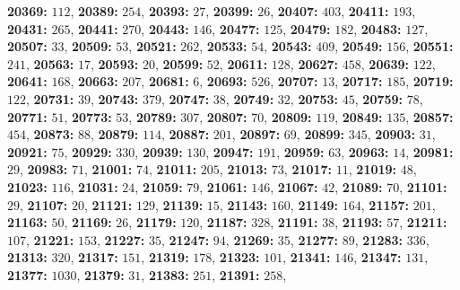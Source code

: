 \textsf{\bfseries 20369:} $112$, \textsf{\bfseries 20389:} $254$, \textsf{\bfseries 20393:} $27$, \textsf{\bfseries 20399:} $26$, \textsf{\bfseries 20407:} $403$, \textsf{\bfseries 20411:} $193$, \textsf{\bfseries 20431:} $265$, \textsf{\bfseries 20441:} $270$, \textsf{\bfseries 20443:} $146$, \textsf{\bfseries 20477:} $125$, \textsf{\bfseries 20479:} $182$, \textsf{\bfseries 20483:} $127$, \textsf{\bfseries 20507:} $33$, \textsf{\bfseries 20509:} $53$, \textsf{\bfseries 20521:} $262$, \textsf{\bfseries 20533:} $54$, \textsf{\bfseries 20543:} $409$, \textsf{\bfseries 20549:} $156$, \textsf{\bfseries 20551:} $241$, \textsf{\bfseries 20563:} $17$, \textsf{\bfseries 20593:} $20$, \textsf{\bfseries 20599:} $52$, \textsf{\bfseries 20611:} $128$, \textsf{\bfseries 20627:} $458$, \textsf{\bfseries 20639:} $122$, \textsf{\bfseries 20641:} $168$, \textsf{\bfseries 20663:} $207$, \textsf{\bfseries 20681:} $6$, \textsf{\bfseries 20693:} $526$, \textsf{\bfseries 20707:} $13$, \textsf{\bfseries 20717:} $185$, \textsf{\bfseries 20719:} $122$, \textsf{\bfseries 20731:} $39$, \textsf{\bfseries 20743:} $379$, \textsf{\bfseries 20747:} $38$, \textsf{\bfseries 20749:} $32$, \textsf{\bfseries 20753:} $45$, \textsf{\bfseries 20759:} $78$, \textsf{\bfseries 20771:} $51$, \textsf{\bfseries 20773:} $53$, \textsf{\bfseries 20789:} $307$, \textsf{\bfseries 20807:} $70$, \textsf{\bfseries 20809:} $119$, \textsf{\bfseries 20849:} $135$, \textsf{\bfseries 20857:} $454$, \textsf{\bfseries 20873:} $88$, \textsf{\bfseries 20879:} $114$, \textsf{\bfseries 20887:} $201$, \textsf{\bfseries 20897:} $69$, \textsf{\bfseries 20899:} $345$, \textsf{\bfseries 20903:} $31$, \textsf{\bfseries 20921:} $75$, \textsf{\bfseries 20929:} $330$, \textsf{\bfseries 20939:} $130$, \textsf{\bfseries 20947:} $191$, \textsf{\bfseries 20959:} $63$, \textsf{\bfseries 20963:} $14$, \textsf{\bfseries 20981:} $29$, \textsf{\bfseries 20983:} $71$, \textsf{\bfseries 21001:} $74$, \textsf{\bfseries 21011:} $205$, \textsf{\bfseries 21013:} $73$, \textsf{\bfseries 21017:} $11$, \textsf{\bfseries 21019:} $48$, \textsf{\bfseries 21023:} $116$, \textsf{\bfseries 21031:} $24$, \textsf{\bfseries 21059:} $79$, \textsf{\bfseries 21061:} $146$, \textsf{\bfseries 21067:} $42$, \textsf{\bfseries 21089:} $70$, \textsf{\bfseries 21101:} $29$, \textsf{\bfseries 21107:} $20$, \textsf{\bfseries 21121:} $129$, \textsf{\bfseries 21139:} $15$, \textsf{\bfseries 21143:} $160$, \textsf{\bfseries 21149:} $164$, \textsf{\bfseries 21157:} $201$, \textsf{\bfseries 21163:} $50$, \textsf{\bfseries 21169:} $26$, \textsf{\bfseries 21179:} $120$, \textsf{\bfseries 21187:} $328$, \textsf{\bfseries 21191:} $38$, \textsf{\bfseries 21193:} $57$, \textsf{\bfseries 21211:} $107$, \textsf{\bfseries 21221:} $153$, \textsf{\bfseries 21227:} $35$, \textsf{\bfseries 21247:} $94$, \textsf{\bfseries 21269:} $35$, \textsf{\bfseries 21277:} $89$, \textsf{\bfseries 21283:} $336$, \textsf{\bfseries 21313:} $320$, \textsf{\bfseries 21317:} $151$, \textsf{\bfseries 21319:} $178$, \textsf{\bfseries 21323:} $101$, \textsf{\bfseries 21341:} $146$, \textsf{\bfseries 21347:} $131$, \textsf{\bfseries 21377:} $1030$, \textsf{\bfseries 21379:} $31$, \textsf{\bfseries 21383:} $251$, \textsf{\bfseries 21391:} $258$, 
